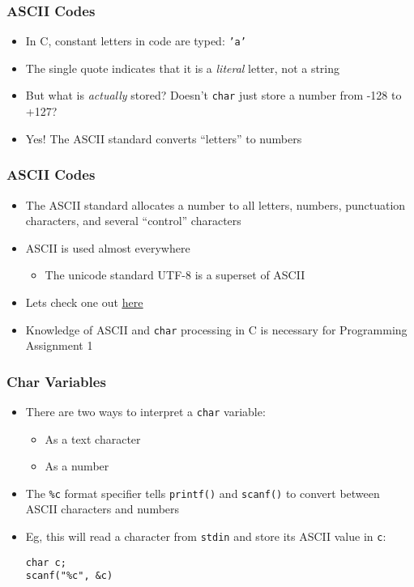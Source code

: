 \documentclass[14pt]{beamer}
\begin{document}
\begin{frame}
\frametitle{ASCII Codes}
\begin{itemize}
\item In C, constant letters in code are typed: \texttt{'a'}
\item The single quote indicates that it is a \textit{literal} letter, not a string
\pause
\item But what is \textit{actually} stored? Doesn't \texttt{char} just store a number from -128 to +127?
\pause
\item Yes! The ASCII standard converts ``letters'' to numbers
\end{itemize}
\end{frame}

\begin{frame}
\frametitle{ASCII Codes}
\begin{itemize}
\item The ASCII standard allocates a number to all letters, numbers, punctuation characters, and several ``control'' characters
\item ASCII is used almost everywhere
	\begin{itemize}
		\item The unicode standard UTF-8 is a superset of ASCII
	\end{itemize}
\item Lets check one out \underline{\href{http://asciichart.com/}{here}}
\item Knowledge of ASCII and \texttt{char} processing in C is necessary for Programming Assignment 1
\end{itemize}
\end{frame}

\begin{frame}[fragile]
\frametitle{Char Variables}
\begin{itemize}
\item There are two ways to interpret a \texttt{char} variable:
	\begin{itemize}
		\item As a text character
		\item As a number
	\end{itemize}
\item The \texttt{\%c} format specifier tells \texttt{printf()} and \texttt{scanf()} to convert between ASCII characters and numbers
\item Eg, this will read a character from \texttt{stdin} and store its ASCII value in \texttt{c}:
\begin{lstlisting}[style=CStyle]
char c;
scanf("%c", &c)
\end{lstlisting}
\end{itemize}
\end{frame}
\end{document}
